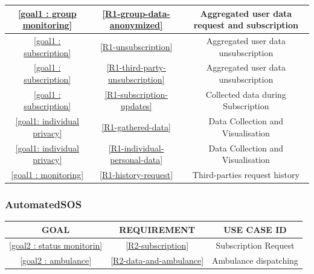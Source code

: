 \begin{table}[H]
\begin{tabular}{|c|c|c|}
                    \hline
                    \ref{goal1 : group monitoring} & \ref{R1-group-data-anonymized}& Aggregated user data request and subscription\\
                    \hline
                    \ref{goal1 : subscription} & \ref{R1-unsubscription}& Aggregated user data unsubscription\\
                    \hline
                    \ref{goal1 : subscription} & \ref{R1-third-party-unsubscription}& Aggregated user data unsubscription\\
                    \hline
                    \ref{goal1 : subscription} & \ref{R1-subscription-updates} & Collected data during Subscription \\
                     \hline
                    \ref{goal1: individual privacy} &\ref{R1-gathered-data}  & Data Collection and Visualisation\\
                     \hline
                    \ref{goal1: individual privacy} &\ref{R1-individual-personal-data}  & Data Collection and Visualisation\\
                    \hline
                    \ref{goal1 : monitoring} & \ref{R1-history-request}& Third-parties request history \\
                    \hline
                \end{tabular}  
            \end{table}
        
        
        \subsubsection{AutomatedSOS}
        
        \begin{table}[H]
            	\centering
                \begin{tabular}{|c|c|c|}
                    \hline
                    \rowcolor[HTML]{03A9F4} \textbf{ GOAL} & \textbf{ REQUIREMENT} & \textbf{USE CASE ID}\\
                    \hline
                    \ref{goal2 : status monitorin} & \ref{R2-subscription}& Subscription Request\\
                    \hline
                    \ref{goal2 : ambulance}  & \ref{R2-data-and-ambulance} & Ambulance dispatching\\
                    \hline
                \end{tabular}  
            \end{table}

